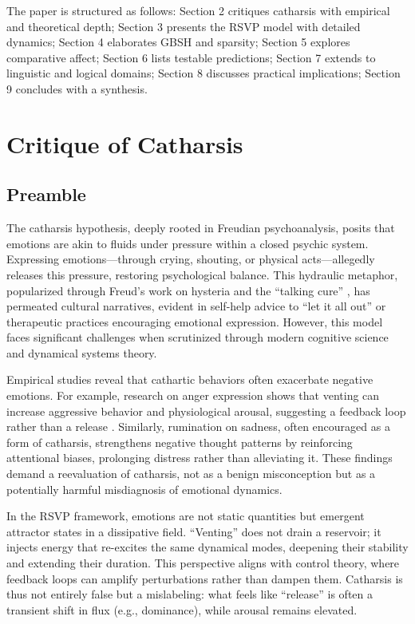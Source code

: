 \documentclass[11pt]{article}
\theoremstyle{plain}
\begin{document}
The paper is structured as follows: Section 2 critiques catharsis with empirical and theoretical depth; Section 3 presents the RSVP model with detailed dynamics; Section 4 elaborates GBSH and sparsity; Section 5 explores comparative affect; Section 6 lists testable predictions; Section 7 extends to linguistic and logical domains; Section 8 discusses practical implications; Section 9 concludes with a synthesis.

\section{Critique of Catharsis}

\subsection{Preamble}
The catharsis hypothesis, deeply rooted in Freudian psychoanalysis, posits that emotions are akin to fluids under pressure within a closed psychic system. Expressing emotions—through crying, shouting, or physical acts—allegedly releases this pressure, restoring psychological balance. This hydraulic metaphor, popularized through Freud’s work on hysteria and the “talking cure” \citep{Douglas1966}, has permeated cultural narratives, evident in self-help advice to “let it all out” or therapeutic practices encouraging emotional expression. However, this model faces significant challenges when scrutinized through modern cognitive science and dynamical systems theory.

Empirical studies reveal that cathartic behaviors often exacerbate negative emotions. For example, research on anger expression shows that venting can increase aggressive behavior and physiological arousal, suggesting a feedback loop rather than a release \citep{Brown1988}. Similarly, rumination on sadness, often encouraged as a form of catharsis, strengthens negative thought patterns by reinforcing attentional biases, prolonging distress rather than alleviating it. These findings demand a reevaluation of catharsis, not as a benign misconception but as a potentially harmful misdiagnosis of emotional dynamics.

In the RSVP framework, emotions are not static quantities but emergent attractor states in a dissipative field. “Venting” does not drain a reservoir; it injects energy that re-excites the same dynamical modes, deepening their stability and extending their duration. This perspective aligns with control theory, where feedback loops can amplify perturbations rather than dampen them. Catharsis is thus not entirely false but a mislabeling: what feels like “release” is often a transient shift in flux (e.g., dominance), while arousal remains elevated.
\end{document}
